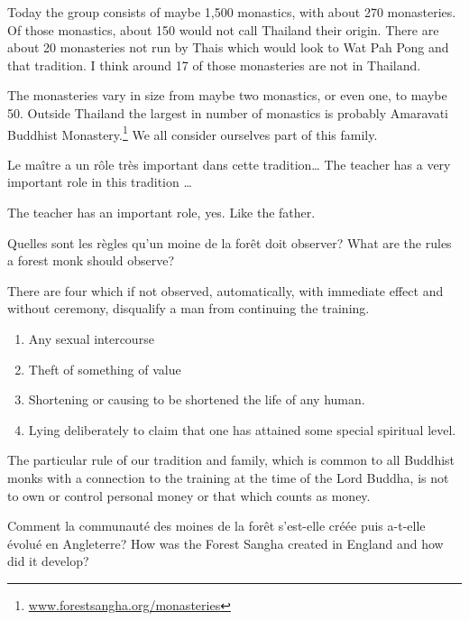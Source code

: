 Today the group consists of maybe 1,500 monastics, with about 270
monasteries. Of those monastics, about 150 would not call Thailand their
origin. There are about 20 monasteries not run by Thais which would
look to Wat Pah Pong and that tradition. I think around 17 of
those monasteries are not in Thailand. 

The monasteries vary in size from maybe two monastics, or even one, to
maybe 50. Outside Thailand the largest in number of monastics is
probably Amaravati Buddhist Monastery.\footnote{\href{http://forestsangha.org/monasteries}{www.forestsangha.org/monasteries}}
We all consider ourselves part of this family.

\questionBi%
{Le maître a un rôle très important dans cette tradition\ldots}%
{The teacher has a very important role in this tradition \ldots}

\answer{}
The teacher has an important role, yes. Like the father.

\questionBi%
{Quelles sont les règles qu'un moine de la forêt doit observer?}%
{What are the rules a forest monk should observe?}

\answer{}
There are four which if not observed, automatically, with immediate
effect and without ceremony, disqualify a man from continuing the
training.

\begin{enumerate}
  \item Any sexual intercourse
  \item Theft of something of value
  \item Shortening or causing to be shortened the life of any human.
  \item Lying deliberately to claim that one has attained some special spiritual level.
\end{enumerate}

The particular rule of our tradition and family, which is common to all
Buddhist monks with a connection to the training at the time of the Lord
Buddha, is not to own or control personal money or that which counts as
money.

\questionBi%
{Comment la communauté des moines de la forêt s'est-elle créée puis a-t-elle évolué en Angleterre?}%
{How was the Forest Sangha created in England and how did it develop?}

